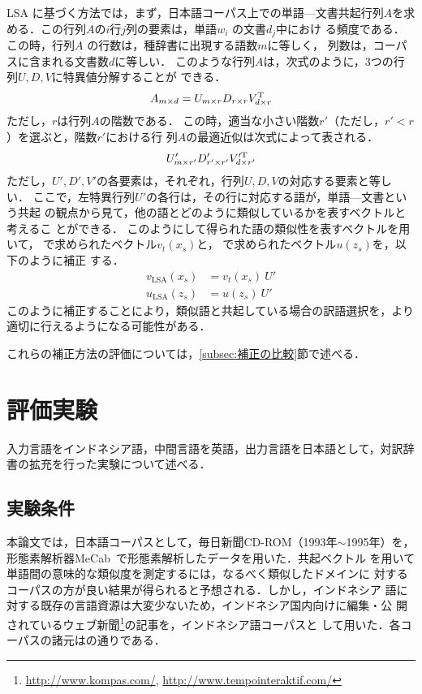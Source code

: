 \documentclass[japanese]{jnlp_1.4}
\newcommand{\tabref}[1]{}
\newcommand{\eqnref}[1]{}
\begin{document}
LSA に基づく方法では，まず，日本語コーパス上での単語—文書共起行列$A$を求
める．この行列$A$の$i$行$j$列の要素は，単語$w_{i}$ の文書$d_{j}$中におけ
る頻度である．この時，行列$A$ の行数は，種辞書に出現する語数$m$に等しく，
列数は，コーパスに含まれる文書数$d$に等しい．
このような行列$A$は，次式のように，3つの行列$U,D,V$に特異値分解することが
できる．
\begin{equation}
  A_{m\times d}=U_{m\times r}D_{r\times r}V^{\rm T}_{d\times r}
\end{equation}
ただし，$r$は行列$A$の階数である．
この時，適当な小さい階数$r'$（ただし，$r'< r$）を選ぶと，階数$r'$における行
列$A$の最適近似は次式によって表される．
\begin{equation}
  U'_{m\times r'}D'_{r'\times r'}V'^{\rm T}_{d\times r'}
\end{equation}
ただし，$U',D',V'$の各要素は，それぞれ，行列$U,D,V$の対応する要素と等し
い．
ここで，左特異行列$U'$の各行は，その行に対応する語が，単語—文書という共起
の観点から見て，他の語とどのように類似しているかを表すベクトルと考えるこ
とができる．
このようにして得られた語の類似性を表すベクトルを用いて，
\eqnref{eq:trans_vector}で求められたベクトル$v_{t}(x_{s})$と，
\eqnref{eq:dst_vector}で求められたベクトル$u(z_{s})$を，以下のように補正
する．
\begin{align}
  v_{\mathrm{LSA}}(x_{s}) &= v_{t}(x_{s})\ U' \label{eq:LSA1} \\
  u_{\mathrm{LSA}}(z_{s}) &= u(z_{s})\ U' \label{eq:LSA2}
\end{align}
このように補正することにより，類似語と共起している場合の訳語選択を，より
適切に行えるようになる可能性がある．

これらの補正方法の評価については，\ref{subsec:補正の比較}節で述べる．


\section{評価実験}
\label{sec:experiment}

入力言語をインドネシア語，中間言語を英語，出力言語を日本語として，対訳辞
書の拡充を行った実験について述べる．

\subsection{実験条件}
\label{subsec:condition}

本論文では，日本語コーパスとして，毎日新聞CD-ROM（1993年$\sim$1995年）を，
形態素解析器MeCab~\cite{mecab}で形態素解析したデータを用いた．共起ベクトル
を用いて単語間の意味的な類似度を測定するには，なるべく類似したドメインに
対するコーパスの方が良い結果が得られると予想される．しかし，インドネシア
語に対する既存の言語資源は大変少ないため，インドネシア国内向けに編集・公
開されているウェブ新聞\footnote{\url{http://www.kompas.com/},
\url{http://www.tempointeraktif.com/}}の記事を，インドネシア語コーパスと
して用いた．各コーパスの諸元は\tabref{tbl:コーパスの諸元}の通りである．
\end{document}
